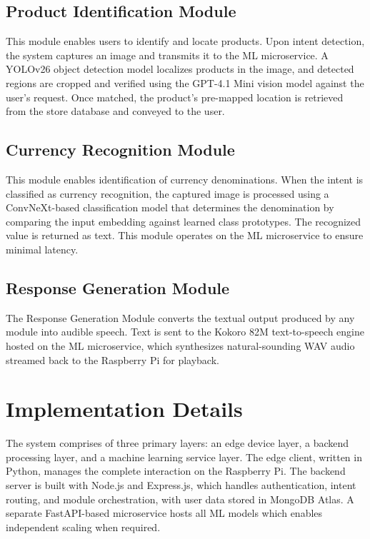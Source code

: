 \documentclass[conference]{IEEEtran}
\begin{document}
\subsection{Product Identification Module}

This module enables users to identify and locate products. Upon intent detection, the system captures an image and transmits it to the ML microservice. A YOLOv26 \cite{b11} object detection model localizes products in the image, and detected regions are cropped and verified using the GPT-4.1 Mini vision model against the user's request. Once matched, the product's pre-mapped location is retrieved from the store database and conveyed to the user.

\subsection{Currency Recognition Module}

This module enables identification of currency denominations. When the intent is classified as currency recognition, the captured image is processed using a ConvNeXt-based \cite{b12} classification model that determines the denomination by comparing the input embedding against learned class prototypes. The recognized value is returned as text. This module operates on the ML microservice to ensure minimal latency.

\subsection{Response Generation Module}

The Response Generation Module converts the textual output produced by any module into audible speech. Text is sent to the Kokoro 82M text-to-speech engine hosted on the ML microservice, which synthesizes natural-sounding WAV audio streamed back to the Raspberry Pi for playback.


\section{Implementation Details}

The system comprises of three primary layers: an edge device layer, a backend processing layer, and a machine learning service layer. The edge client, written in Python, manages the complete interaction on the Raspberry Pi. The backend server is built with Node.js and Express.js, which handles authentication, intent routing, and module orchestration, with user data stored in MongoDB Atlas. A separate FastAPI-based microservice hosts all ML models which enables independent scaling when required.
\end{document}
